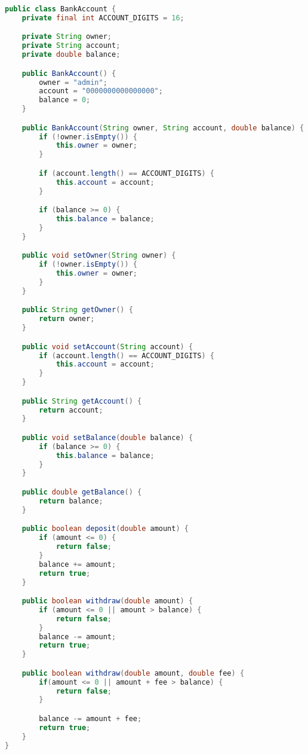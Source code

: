 
\begin{lstlisting}[language=Java]
public class BankAccount {
    private final int ACCOUNT_DIGITS = 16;

    private String owner;
    private String account;
    private double balance;

    public BankAccount() {
        owner = "admin";
        account = "0000000000000000";
        balance = 0;
    }

    public BankAccount(String owner, String account, double balance) {
        if (!owner.isEmpty()) {
            this.owner = owner;
        }

        if (account.length() == ACCOUNT_DIGITS) {
            this.account = account;
        }

        if (balance >= 0) {
            this.balance = balance;
        }
    }

    public void setOwner(String owner) {
        if (!owner.isEmpty()) {
            this.owner = owner;
        }
    }

    public String getOwner() {
        return owner;
    }

    public void setAccount(String account) {
        if (account.length() == ACCOUNT_DIGITS) {
            this.account = account;
        }
    }

    public String getAccount() {
        return account;
    }

    public void setBalance(double balance) {
        if (balance >= 0) {
            this.balance = balance;
        }
    }

    public double getBalance() {
        return balance;
    }

    public boolean deposit(double amount) {
        if (amount <= 0) {
            return false;
        }
        balance += amount;
        return true;
    }

    public boolean withdraw(double amount) {
        if (amount <= 0 || amount > balance) {
            return false;
        }
        balance -= amount;
        return true;
    }

    public boolean withdraw(double amount, double fee) {
        if(amount <= 0 || amount + fee > balance) {
            return false;
        }

        balance -= amount + fee;
        return true;
    }
}
\end{lstlisting}

